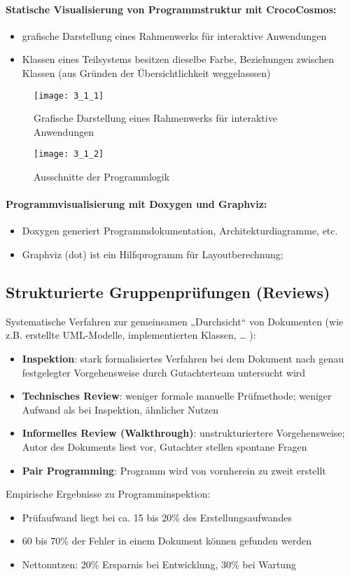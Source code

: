 \paragraph{Statische Visualisierung von Programmstruktur mit CrocoCosmos:}
\begin{itemize}
	\item grafische Darstellung eines Rahmenwerks für interaktive Anwendungen
	\item Klassen eines Teilsystems besitzen dieselbe Farbe, Beziehungen zwischen Klassen (aus Gründen der Übersichtlichkeit weggelasssen)
\end{itemize}
\begin{figure}[h]
	\centering
	\caption{Grafische Darstellung eines Rahmenwerks für interaktive Anwendungen}
	\texttt{[image: 3\_1\_1]}
\end{figure}
\begin{figure}[h]
\centering
\caption{Ausschnitte der Programmlogik}
\texttt{[image: 3\_1\_2]}
\end{figure}

\paragraph{Programmvisualisierung mit Doxygen und Graphviz:}
\begin{itemize}
	\item Doxygen generiert Programmdokumentation, Architekturdiagramme, etc.
	\item Graphviz (dot) ist ein Hilfsprogramm für Layoutberechnung;
\end{itemize}

\subsection{Strukturierte Gruppenprüfungen (Reviews)}
Systematische Verfahren zur gemeinsamen „Durchsicht“ von Dokumenten (wie z.B. erstellte UML-Modelle, implementierten Klassen, … ):
\begin{itemize}
	\item \textbf{Inspektion}: stark formalisiertes Verfahren bei dem Dokument nach genau festgelegter Vorgehensweise durch Gutachterteam untersucht wird
	\item \textbf{Technisches Review}: weniger formale manuelle Prüfmethode; weniger Aufwand als bei Inspektion, ähnlicher Nutzen
	\item \textbf{Informelles Review (Walkthrough)}: unstrukturiertere Vorgehensweise; Autor des Dokuments liest vor, Gutachter stellen spontane Fragen
	\item \textbf{Pair Programming}: Programm wird von vornherein zu zweit erstellt
\end{itemize}
Empirische Ergebnisse zu Programminspektion:
\begin{itemize}
\item Prüfaufwand liegt bei ca. 15 bis 20\% des Erstellungsaufwandes
\item 60 bis 70\% der Fehler in einem Dokument können gefunden werden
\item Nettonutzen: 20\% Ersparnis bei Entwicklung, 30\% bei Wartung
\end{itemize}

